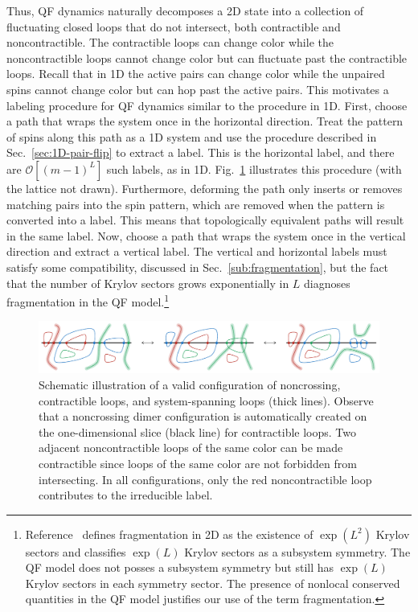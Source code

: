 Thus, QF dynamics naturally decomposes a 2D state into a collection of fluctuating closed loops that do not intersect, both contractible and noncontractible. The contractible loops can change color while the noncontractible loops cannot change color but can fluctuate past the contractible loops. Recall that in 1D the active pairs can change color while the unpaired spins cannot change color but can hop past the active pairs. This motivates a labeling procedure for QF dynamics similar to the procedure in 1D. First, choose a path that wraps the system once in the horizontal direction. Treat the pattern of spins along this path as a 1D system and use the procedure described in Sec.~\ref{sec:1D-pair-flip} to extract a label. This is the horizontal label, and there are $\mathcal{O}[(m-1)^L]$ such labels, as in 1D. Fig.~\ref{fig:spanning-loops} illustrates this procedure (with the lattice not drawn). Furthermore, deforming the path only inserts or removes matching pairs into the spin pattern, which are removed when the pattern is converted into a label. This means that topologically equivalent paths will result in the same label. Now, choose a path that wraps the system once in the vertical direction and extract a vertical label. The vertical and horizontal labels must satisfy some compatibility, discussed in Sec.~\ref{sub:fragmentation}, but the fact that the number of Krylov sectors grows exponentially in $L$ diagnoses fragmentation in the QF model.\footnote{Reference~\cite{Moudgalya2022Commutant} defines fragmentation in 2D as the existence of $\exp(L^2)$ Krylov sectors and classifies $\exp(L)$ Krylov sectors as a subsystem symmetry. The QF model does not posses a subsystem symmetry but still has $\exp(L)$ Krylov sectors in each symmetry sector. The presence of nonlocal conserved quantities in the QF model justifies our use of the term fragmentation.}

\begin{figure}[t]
    \centering
    \includegraphics[width=.8\linewidth]{img/winding_loop_x3.pdf}
    \caption[Schematic illustration of a valid configuration of noncrossing loops]{Schematic illustration of a valid configuration of noncrossing, contractible loops, and system-spanning loops (thick lines). Observe that a noncrossing dimer configuration is automatically created on the one-dimensional slice (black line) for contractible loops. Two adjacent noncontractible loops of the same color can be made contractible since loops of the same color are not forbidden from intersecting. In all configurations, only the red noncontractible loop contributes to the irreducible label.}
    \label{fig:spanning-loops}
\end{figure}

